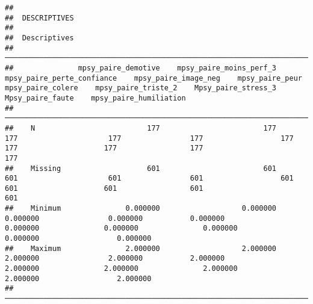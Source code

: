 \documentclass[
]{article}
\begin{document}
\begin{verbatim}
## 
##  DESCRIPTIVES
## 
##  Descriptives                                                                                                                                                                                                                                            
##  ─────────────────────────────────────────────────────────────────────────────────────────────────────────────────────────────────────────────────────────────────────────────────────────────────────────────────────────────────────────────────────── 
##               mpsy_paire_demotive    mpsy_paire_moins_perf_3    mpsy_paire_perte_confiance    mpsy_paire_image_neg    mpsy_paire_peur    mpsy_paire_colere    mpsy_paire_triste_2    Mpsy_paire_stress_3    Mpsy_paire_faute    mpsy_paire_humiliation   
##  ─────────────────────────────────────────────────────────────────────────────────────────────────────────────────────────────────────────────────────────────────────────────────────────────────────────────────────────────────────────────────────── 
##    N                          177                        177                           177                     177                177                  177                    177                    177                 177                       177   
##    Missing                    601                        601                           601                     601                601                  601                    601                    601                 601                       601   
##    Minimum               0.000000                   0.000000                      0.000000                0.000000           0.000000             0.000000               0.000000               0.000000            0.000000                  0.000000   
##    Maximum               2.000000                   2.000000                      2.000000                2.000000           2.000000             2.000000               2.000000               2.000000            2.000000                  2.000000   
##  ───────────────────────────────────────────────────────────────────────────────────────────────────────────────────────────────────────────────────────────────────────────────────────────────────────────────────────────────────────────────────────
\end{verbatim}
\end{document}
